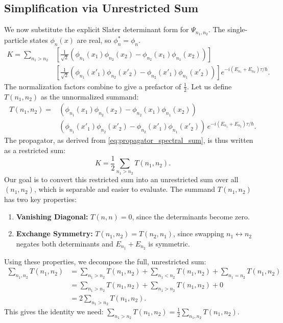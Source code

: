 \subsection{Simplification via Unrestricted Sum}

We now substitute the explicit Slater determinant form for
$\Psi_{n_1, n_2}$. The single-particle states $\phi_n(x)$ are real,
so $\phi_n^* = \phi_n$.
\begin{align}
  K = \sum_{n_1>n_2}
    & \left[ \frac{1}{\sqrt{2}}(\phi_{n_1}(x_1)\phi_{n_2}(x_2) -
    \phi_{n_2}(x_1)\phi_{n_1}(x_2)) \right] \nonumber \\
    & \left[ \frac{1}{\sqrt{2}}(\phi_{n_1}(x'_1)\phi_{n_2}(x'_2) -
    \phi_{n_2}(x'_1)\phi_{n_1}(x'_2)) \right]
    e^{-i(E_{n_1}+E_{n_2})\tau/\hbar}.
\end{align}
The normalization factors combine to give a prefactor of $\frac{1}{2}$.
Let us define $T(n_1, n_2)$ as the unnormalized summand:
\begin{align}
  T(n_1, n_2) =
    & (\phi_{n_1}(x_1)\phi_{n_2}(x_2) - \phi_{n_2}(x_1)\phi_{n_1}(x_2))
    \nonumber \\
    & (\phi_{n_1}(x'_1)\phi_{n_2}(x'_2) - \phi_{n_2}(x'_1)\phi_{n_1}(x'_2))
    \, e^{-i(E_{n_1}+E_{n_2})\tau/\hbar}.
\end{align}
The propagator, as derived from \cref{eq:propagator_spectral_sum}, is
thus written as a restricted sum:
\begin{equation} \label{eq:prop_restricted_sum}
  K = \frac{1}{2} \sum_{n_1>n_2} T(n_1, n_2).
\end{equation}
Our goal is to convert this restricted sum into an unrestricted sum
over all $(n_1, n_2)$, which is separable and easier to evaluate.
The summand $T(n_1, n_2)$ has two key properties:
\begin{enumerate}
  \item \textbf{Vanishing Diagonal:} $T(n, n) = 0$, since the
    determinants become zero.
  \item \textbf{Exchange Symmetry:} $T(n_1, n_2) = T(n_2, n_1)$, since
    swapping $n_1 \leftrightarrow n_2$ negates both determinants
    and $E_{n_1}+E_{n_2}$ is symmetric.
\end{enumerate}
Using these properties, we decompose the full, unrestricted sum:
\begin{align}
  \sum_{n_1, n_2} T(n_1, n_2)
    &= \sum_{n_1 > n_2} T(n_1, n_2) + \sum_{n_1 < n_2} T(n_1, n_2)
    + \sum_{n_1 = n_2} T(n_1, n_2) \nonumber \\
    &= \sum_{n_1 > n_2} T(n_1, n_2) + \sum_{n_1 > n_2} T(n_1, n_2) + 0
    \nonumber \\
    &= 2 \sum_{n_1 > n_2} T(n_1, n_2).
\end{align}
This gives the identity we need:
$\sum_{n_1 > n_2} T(n_1, n_2) = \frac{1}{2} \sum_{n_1, n_2} T(n_1, n_2)$.

